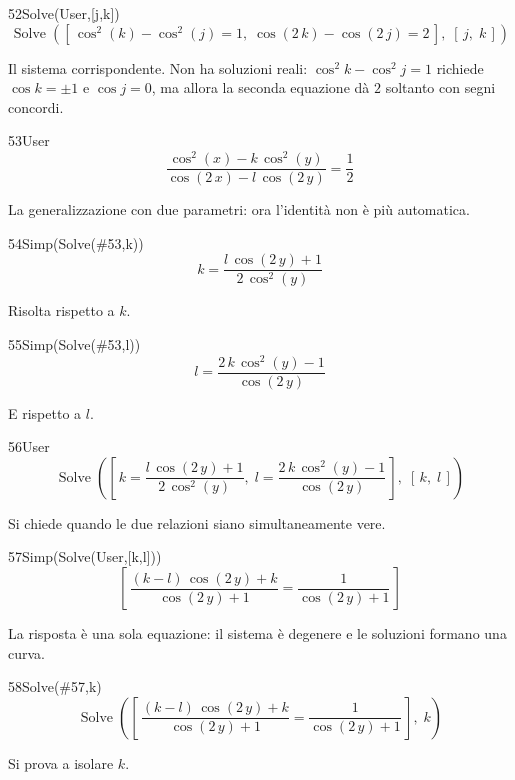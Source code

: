 \begin{espr}{52}{Solve(User,[j,k])}{}
\[
\operatorname{Solve}\!\left(\left[\, \cos^{2}\!\left(k\right) - \cos^{2}\!\left(j\right) = 1,\; \cos\!\left(2\, k\right) - \cos\!\left(2\, j\right) = 2 \,\right],\; \left[\, j,\; k \,\right]\right)
\]
\end{espr}
Il sistema corrispondente. Non ha soluzioni reali: $\cos^2k-\cos^2j=1$ richiede $\cos k=\pm1$ e $\cos j=0$, ma allora la seconda equazione dà $2$ soltanto con segni concordi.

\begin{espr}{53}{User}{}
\[
\frac{\cos^{2}\!\left(x\right) - k\, \cos^{2}\!\left(y\right)}{\cos\!\left(2\, x\right) - l\, \cos\!\left(2\, y\right)} = \frac{1}{2}
\]
\end{espr}
La generalizzazione con due parametri: ora l'identità non è più automatica.

\begin{espr}{54}{Simp(Solve(\#53,k))}{}
\[
k = \frac{l\, \cos\!\left(2\, y\right) + 1}{2\, \cos^{2}\!\left(y\right)}
\]
\end{espr}
Risolta rispetto a $k$.

\begin{espr}{55}{Simp(Solve(\#53,l))}{}
\[
l = \frac{2\, k\, \cos^{2}\!\left(y\right) - 1}{\cos\!\left(2\, y\right)}
\]
\end{espr}
E rispetto a $l$.

\begin{espr}{56}{User}{}
\[
\operatorname{Solve}\!\left(\left[\, k = \frac{l\, \cos\!\left(2\, y\right) + 1}{2\, \cos^{2}\!\left(y\right)},\; l = \frac{2\, k\, \cos^{2}\!\left(y\right) - 1}{\cos\!\left(2\, y\right)} \,\right],\; \left[\, k,\; l \,\right]\right)
\]
\end{espr}
Si chiede quando le due relazioni siano simultaneamente vere.

\begin{espr}{57}{Simp(Solve(User,[k,l]))}{}
\[
\left[\, \frac{\left(k - l\right)\, \cos\!\left(2\, y\right) + k}{\cos\!\left(2\, y\right) + 1} = \frac{1}{\cos\!\left(2\, y\right) + 1} \,\right]
\]
\end{espr}
La risposta è una sola equazione: il sistema è degenere e le soluzioni formano una curva.

\begin{espr}{58}{Solve(\#57,k)}{}
\[
\operatorname{Solve}\!\left(\left[\, \frac{\left(k - l\right)\, \cos\!\left(2\, y\right) + k}{\cos\!\left(2\, y\right) + 1} = \frac{1}{\cos\!\left(2\, y\right) + 1} \,\right],\; k\right)
\]
\end{espr}
Si prova a isolare $k$.

